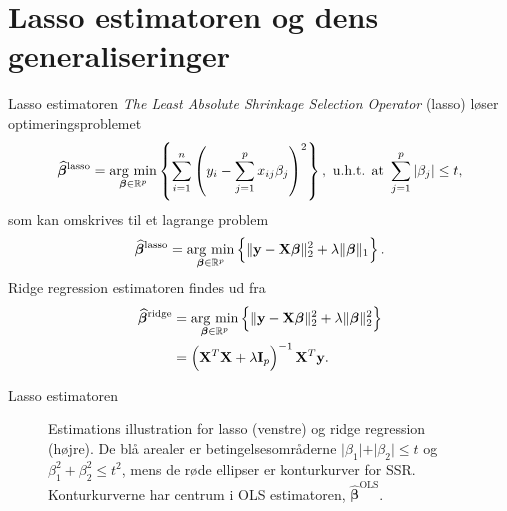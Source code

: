 \section{Lasso estimatoren og dens generaliseringer}
\begin{frame}{Lasso estimatoren}
\textit{The Least Absolute Shrinkage Selection Operator} (lasso) løser optimeringsproblemet
\begin{align*}
\widehat{\boldsymbol{\beta}}^\text{lasso} = \argmin_{\boldsymbol{\beta} \in \R^p} \cbr{\sum_{i=1}^n \del{y_i - \sum_{j=1}^p x_{ij} \beta_j}^2}, \ \text{u.h.t. at } \sum_{j=1}^p \vert \beta_j \vert \leq t,
\end{align*} 
som kan omskrives til et lagrange problem
\begin{align*}
\widehat{\boldsymbol{\beta}}^\text{lasso} = \argmin_{\boldsymbol{\beta} \in \R^p} \cbr{ \Vert \mathbf{y} - \mathbf{X} \boldsymbol{\beta} \Vert_2^2 + \lambda \Vert \boldsymbol{\beta} \Vert_1}.
\end{align*}
Ridge regression estimatoren findes ud fra
\begin{align*}
\widehat{\boldsymbol{\beta}}^\text{ridge} &= \argmin_{\boldsymbol{\beta} \in \R^p} \cbr{ \Vert \mathbf{y} - \mathbf{X} \boldsymbol{\beta} \Vert_2^2 + \lambda \Vert \boldsymbol{\beta} \Vert_2^2} \\
&= \del{\mathbf{X}^T \mathbf{X} + \lambda \mathbf{I}_p}^{-1} \mathbf{X}^T \mathbf{y}.
\end{align*} 
\end{frame}

\begin{frame}{Lasso estimatoren}
\begin{figure}[H]
\centering
\begin{minipage}{0.4\linewidth}
\scalebox{0.6}{}
\end{minipage}
\hspace{0.2cm}
\begin{minipage}{0.4\linewidth}
\scalebox{0.6}{}
\end{minipage}
\caption{Estimations illustration for lasso (venstre) og ridge regression (højre). 
De blå arealer er betingelsesområderne $\vert \beta_1 \vert+\vert \beta_2 \vert \leq t$ og $\beta_1^2+\beta_2^2 \leq t^2$, mens de røde ellipser er konturkurver for SSR. Konturkurverne har centrum i OLS estimatoren, $\widehat{\boldsymbol{\beta}}^\text{OLS}$.}
\end{figure}
\end{frame}



